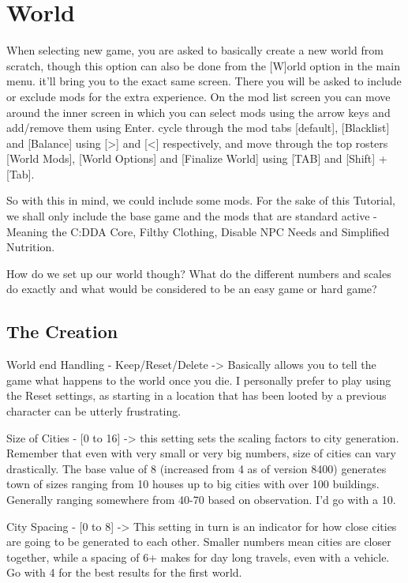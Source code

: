 \chapter{World}

When selecting new game, you are asked to basically create a new world from scratch, though this option can also be done from the [W]orld option in the main menu. it'll bring you to the exact same screen. There you will be asked to include or exclude mods for the extra experience.
On the mod list screen you can move around the inner screen in which you can select mods using the arrow keys and add/remove them using Enter. cycle through the mod tabs [default], [Blacklist] and [Balance] using [>] and [<] respectively, and move through the top rosters [World Mods], [World Options] and [Finalize World] using [TAB] and [Shift] + [Tab].

So with this in mind, we could include some mods. For the sake of this Tutorial, we shall only include the base game and the mods that are standard active - Meaning the C:DDA Core, Filthy Clothing, Disable NPC Needs and Simplified Nutrition.

How do we set up our world though? What do the different numbers and scales do exactly and what would be considered to be an easy game or hard game?


\section{The Creation}

World end Handling - Keep/Reset/Delete -> Basically allows you to tell the game what happens to the world once you die. I personally prefer to play using the Reset settings, as starting in a location that has been looted by a previous character can be utterly frustrating.

Size of Cities - [0 to 16] -> this setting sets the scaling factors to city generation. Remember that even with very small or very big numbers, size of cities can vary drastically. The base value of 8 (increased from 4 as of version 8400)  generates town of sizes ranging from 10 houses up to big cities with over 100 buildings. Generally ranging somewhere from 40-70 based on observation. I'd go with a 10.

City Spacing - [0 to 8] -> This setting in turn is an indicator for how close cities are going to be generated to each other. Smaller numbers mean cities are closer together, while a spacing of 6+ makes for day long travels, even with a vehicle. Go with 4 for the best results for the first world.


